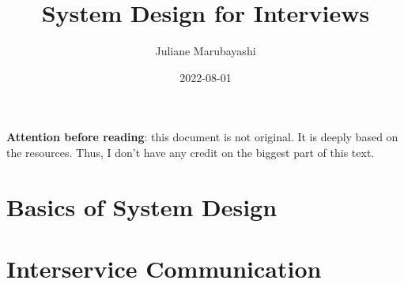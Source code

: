 \documentclass{article}
\title{System Design for Interviews}
\author{Juliane Marubayashi}
\date{ 2022-08-01 }
\begin{document}
    \maketitle
    \newpage
    \tableofcontents
    \newpage
    \textbf{Attention before reading}: this document is not original. It is deeply based on the resources.
    Thus, I don't have any credit on the biggest part of this text. 
    \section{Basics of System Design}
    
    \section{Interservice Communication}
    
    
    
\end{document}
